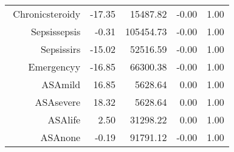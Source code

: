 \begin{tabular}{rrrrr}
$$  Chronic\-steroid\-y & -17.35 & 15487.82 & -0.00 & 1.00 \\ 
  Sepsis\-sepsis & -0.31 & 105454.73 & -0.00 & 1.00 \\ 
  Sepsis\-sirs & -15.02 & 52516.59 & -0.00 & 1.00 \\ 
  Emergency\-y & -16.85 & 66300.38 & -0.00 & 1.00 \\ 
  ASA\-mild & 16.85 & 5628.64 & 0.00 & 1.00 \\ 
  ASA\-severe & 18.32 & 5628.64 & 0.00 & 1.00 \\ 
  ASA\-life & 2.50 & 31298.22 & 0.00 & 1.00 \\ 
  ASA\-none & -0.19 & 91791.12 & -0.00 & 1.00 \\ 
   \hline
\end{tabular}

